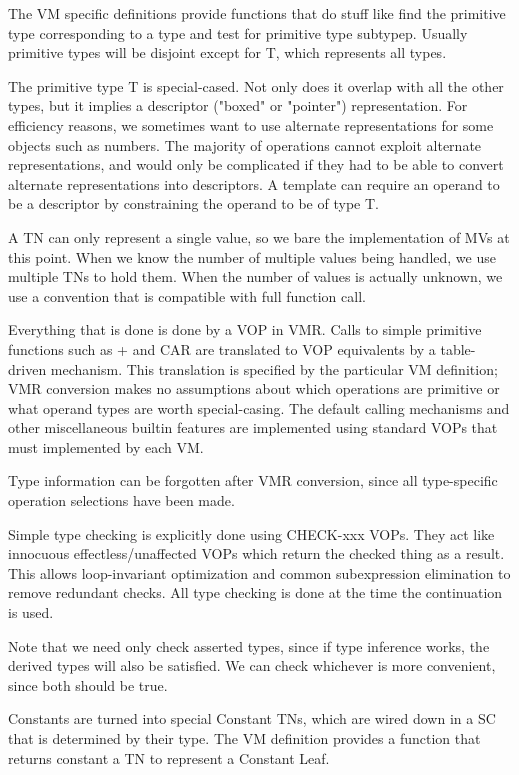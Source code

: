 The VM specific definitions provide functions that do stuff like find the
primitive type corresponding to a type and test for primitive type subtypep.
Usually primitive types will be disjoint except for T, which represents all
types.

The primitive type T is special-cased.  Not only does it overlap with all the
other types, but it implies a descriptor ("boxed" or "pointer") representation.
For efficiency reasons, we sometimes want to use
alternate representations for some objects such as numbers.  The majority of
operations cannot exploit alternate representations, and would only be
complicated if they had to be able to convert alternate representations into
descriptors.  A template can require an operand to be a descriptor by
constraining the operand to be of type T.

A TN can only represent a single value, so we bare the implementation of MVs at
this point.  When we know the number of multiple values being handled, we use
multiple TNs to hold them.  When the number of values is actually unknown, we
use a convention that is compatible with full function call.

Everything that is done is done by a VOP in VMR.  Calls to simple primitive
functions such as + and CAR are translated to VOP equivalents by a table-driven
mechanism.  This translation is specified by the particular VM definition; VMR
conversion makes no assumptions about which operations are primitive or what
operand types are worth special-casing.  The default calling mechanisms and
other miscellaneous builtin features are implemented using standard VOPs that
must implemented by each VM.

Type information can be forgotten after VMR conversion, since all type-specific
operation selections have been made.

Simple type checking is explicitly done using CHECK-xxx VOPs.  They act like
innocuous effectless/unaffected VOPs which return the checked thing as a
result.  This allows loop-invariant optimization and common subexpression
elimination to remove redundant checks.  All type checking is done at the time
the continuation is used.

Note that we need only check asserted types, since if type inference works, the
derived types will also be satisfied.  We can check whichever is more
convenient, since both should be true.

Constants are turned into special Constant TNs, which are wired down in a SC
that is determined by their type.  The VM definition provides a function that
returns constant a TN to represent a Constant Leaf. 

